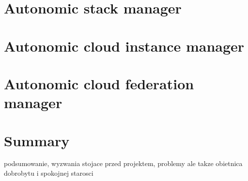 \section{Autonomic stack manager}

\section{Autonomic cloud instance manager}

\section{Autonomic cloud federation manager}

\section{Summary}
podsumowanie, wyzwania stojace przed projektem, problemy ale takze obietnica dobrobytu i spokojnej starosci




